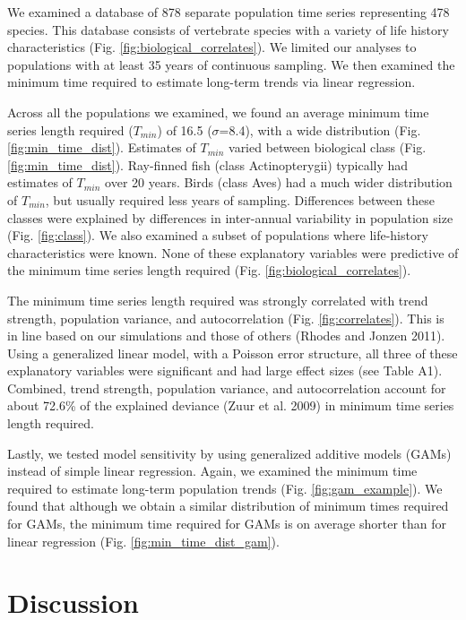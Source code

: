\documentclass[12pt,]{article}
\begin{document}
We examined a database of 878 separate population time series
representing 478 species. This database consists of vertebrate species
with a variety of life history characteristics (Fig.
\ref{fig:biological_correlates}). We limited our analyses to populations
with at least 35 years of continuous sampling. We then examined the
minimum time required to estimate long-term trends via linear
regression.

Across all the populations we examined, we found an average minimum time
series length required (\(T_{min}\)) of 16.5 (\(\sigma\)=8.4), with a
wide distribution (Fig. \ref{fig:min_time_dist}). Estimates of
\(T_{min}\) varied between biological class (Fig.
\ref{fig:min_time_dist}). Ray-finned fish (class Actinopterygii)
typically had estimates of \(T_{min}\) over 20 years. Birds (class Aves)
had a much wider distribution of \(T_{min}\), but usually required less
years of sampling. Differences between these classes were explained by
differences in inter-annual variability in population size (Fig.
\ref{fig:class}). We also examined a subset of populations where
life-history characteristics were known. None of these explanatory
variables were predictive of the minimum time series length required
(Fig. \ref{fig:biological_correlates}).

The minimum time series length required was strongly correlated with
trend strength, population variance, and autocorrelation (Fig.
\ref{fig:correlates}). This is in line based on our simulations and
those of others (Rhodes and Jonzen 2011). Using a generalized linear
model, with a Poisson error structure, all three of these explanatory
variables were significant and had large effect sizes (see Table A1).
Combined, trend strength, population variance, and autocorrelation
account for about 72.6\% of the explained deviance (Zuur et al. 2009) in
minimum time series length required.

Lastly, we tested model sensitivity by using generalized additive models
(GAMs) instead of simple linear regression. Again, we examined the
minimum time required to estimate long-term population trends (Fig.
\ref{fig:gam_example}). We found that although we obtain a similar
distribution of minimum times required for GAMs, the minimum time
required for GAMs is on average shorter than for linear regression (Fig.
\ref{fig:min_time_dist_gam}).

\section{Discussion}\label{discussion}
\end{document}
